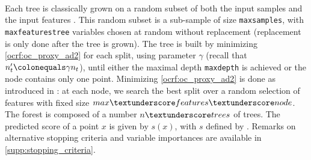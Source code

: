 \paragraph{}
Each tree is classically grown on a random subset of both the input samples and
the input features \citep{Ho1998, Panov2007}.  This random subset is a
sub-sample of size \texttt{max\textunderscore samples}, with
\texttt{max\textunderscore features\textunderscore tree} variables chosen at
random without replacement (replacement is only done after the tree is grown).
The tree is built by minimizing \cref{ocrf:oc_proxy_ad2} for each split, using
parameter $\gamma$ (recall that $n_t' \colonequals \gamma n_t$), until either
the maximal depth \texttt{max\textunderscore depth} is achieved or the node
contains only one point.
Minimizing \cref{ocrf:oc_proxy_ad2} is done as introduced in \citet{Amit1997}:
at each node, we search the best split over a random selection of features with
fixed size $max\textunderscore features\textunderscore node$.
%
The forest is composed of a number $n\textunderscore trees$ of trees. The
predicted score of a point $x$ is given by $s(x)$, with $s$ defined by
.
Remarks on alternative stopping criteria and variable importances are available
in \cref{supp:stopping_criteria}.
